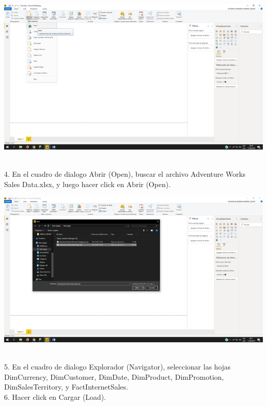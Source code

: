 \begin{center}
\includegraphics[width=15cm]{./Imagenes/img01} 
\end{center}

\begin{itemize}
\\ 4. En el cuadro de dialogo Abrir (Open), buscar el archivo Adventure Works Sales Data.xlsx, y luego hacer click en Abrir (Open).
\end{itemize} 

\begin{center}
\includegraphics[width=15cm]{./Imagenes/img02} 
\end{center}

\begin{itemize}
\\ 5. En el cuadro de dialogo Explorador (Navigator), seleccionar las hojas DimCurrency, DimCustomer,
DimDate, DimProduct, DimPromotion, DimSalesTerritory, y FactInternetSales.
\\ 6. Hacer click en Cargar (Load).

\end{itemize} 

